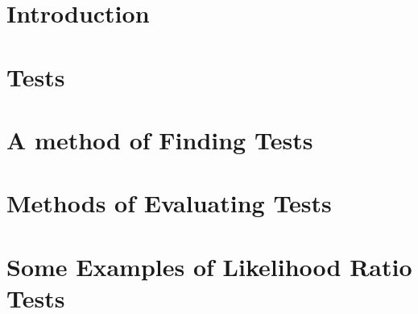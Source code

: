 \section{Introduction}

\section{Tests}

\section{A method of Finding Tests}

\section{Methods of Evaluating Tests}

\section{Some Examples of Likelihood Ratio Tests}

